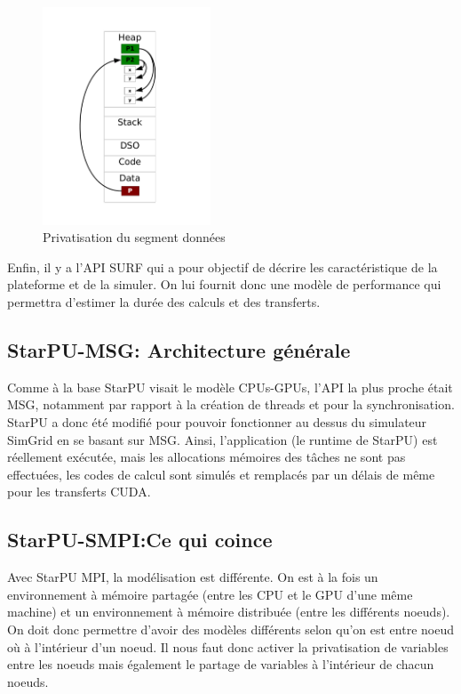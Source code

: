 \documentclass[smallextended]{svjour3}
\begin{document}
\begin{figure}[htb]
\centering
\includegraphics[width=5cm]{./Img/Memoire.pdf}
\caption{\label{fig:1}Privatisation du segment données}
\end{figure}

Enfin, il y a l'API SURF qui a pour objectif de décrire les
caractéristique de la plateforme et de la simuler. On lui fournit
donc une modèle de performance qui permettra d'estimer la durée des
calculs et des transferts.

\subsection{StarPU-MSG: Architecture générale}
\label{sec-3-2}
Comme à la base StarPU visait le modèle CPUs-GPUs, l'API la plus
proche était MSG, notamment par rapport à la création de threads et
pour la synchronisation. StarPU a donc été modifié pour pouvoir
fonctionner au dessus du simulateur SimGrid en se basant sur
MSG. Ainsi, l'application (le runtime de StarPU) est réellement
exécutée, mais les allocations mémoires des tâches ne sont pas
effectuées, les codes de calcul sont simulés et remplacés par un
délais de même pour les transferts CUDA. 

\subsection{StarPU-SMPI:Ce qui coince}
\label{sec-3-3}
Avec StarPU MPI, la modélisation est différente. On est à la fois
un environnement à mémoire partagée (entre les CPU et le GPU
d'une même machine) et un environnement à mémoire distribuée
(entre les différents noeuds). On doit donc permettre d'avoir des
modèles différents selon qu'on est entre noeud où à l'intérieur
d'un noeud. Il nous faut donc activer la privatisation de variables
entre les noeuds mais également le partage de variables à
l'intérieur de chacun noeuds. 
\end{document}
